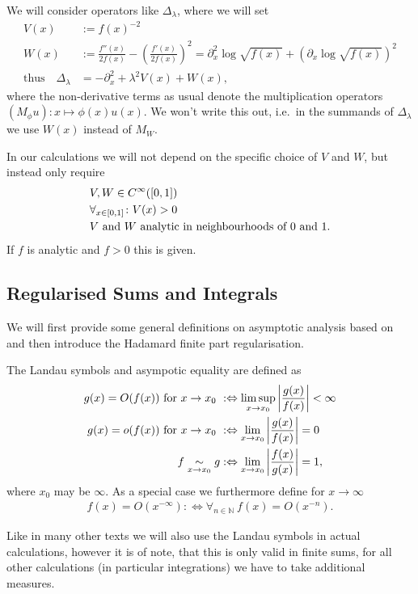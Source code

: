 We will consider operators like $\Delta_\lambda$, where we will set
\begin{align}
  V(x) &:= f(x)^{-2} \\
  W(x) &:= \frac{f''(x)}{2f(x)} - \left(\frac{f'(x)}{2f(x)}\right)^2 =
  \partial_x^2 \log\sqrt{f(x)} + \left(\partial_x \log\sqrt{f(x)}\right)^2 \\
  \text{thus}\quad \Delta_\lambda &= -\partial^2_x + \lambda^2 V(x) + W(x),
\end{align}
where the non-derivative terms as usual denote the multiplication operators
$(M_\phi u)\colon x \mapsto \phi(x)u(x)$. We won't write this out, i.e.\ in the
summands of $\Delta_\lambda$ we use $W(x)$ instead of $M_W$.

In our calculations we will not depend on the specific choice of $V$ and $W$,
but instead only require
\begin{align*}
  &V,W\in C^\infty_{}([0,1]) \\
  &\forall_{x\in[0,1]}\colon V(x) > 0 \\
  &V\text{ and }W\text{ analytic in neighbourhoods of $0$ and $1$}.
\end{align*}
If $f$ is analytic and $f>0$ this is given.

\subsection{Regularised Sums and Integrals}
\label{sec:regsum-int}
We will first provide some general definitions on asymptotic analysis based on
\cite[Ch.1]{Miller2006} and then introduce the Hadamard finite part regularisation.
\begin{Definition}
  The Landau symbols and asympotic equality are defined as
  \begin{align}
    g(x) = O(f(x))\text{ for $x\to x_0$ } &:\Leftrightarrow \limsup_{x\to x_0}
    \left|\frac{g(x)}{f(x)}\right| < \infty \\
    g(x) = o(f(x))\text{ for $x\to x_0$ } &:\Leftrightarrow \lim_{x\to
    x_0}\left|\frac{g(x)}{f(x)}\right| = 0 \\
    f \mathrel{\underset{x\to x_0}{\sim}} g &:\Leftrightarrow \lim_{x\to x_0}
    \left|\frac{f(x)}{g(x)}\right| = 1,
  \end{align}
  where $x_0$ may be $\infty$. As a special case we furthermore define for
  $x\to\infty$
  \begin{align}
    f(x) = O(x^{-\infty}) :\Leftrightarrow \forall_{n\in\mathbb{N}}\ f(x) =
    O(x^{-n}).
  \end{align}
\end{Definition}
Like in many other texts we will also use the Landau symbols in actual
calculations, however it is of note, that this is only valid in finite sums, for
all other calculations (in particular integrations) we have to take additional
measures.

